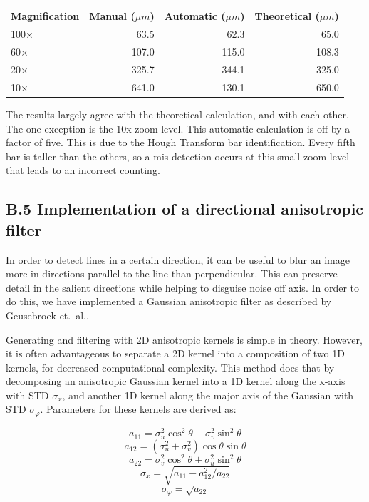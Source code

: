 \documentclass{article}
\begin{document}
\begin{center}
\begin{tabular}{l | r | r | r}
     Magnification & Manual ($\mu m$) & Automatic ($\mu m$) & Theoretical ($\mu m$) \\
     \hline\hline
     100$\times$                & 63.5            & 62.3               & 65.0 \\ \hline
     60$\times$                 & 107.0           & 115.0              & 108.3 \\ \hline
     20$\times$                 & 325.7           & 344.1              & 325.0 \\ \hline
     10$\times$                 & 641.0           & 130.1              & 650.0
\end{tabular}
\end{center}

The results largely agree with the theoretical calculation, and with each other. The one exception is the 10x zoom level. This automatic calculation is off by a factor of five. This is due to the Hough Transform bar identification. Every fifth bar is taller than the others, so a mis-detection occurs at this small zoom level that leads to an incorrect counting.


\subsection*{B.5 Implementation of a directional anisotropic filter}

In order to detect lines in a certain direction, it can be useful to blur an image more in directions parallel to the line than perpendicular. This can preserve detail in the salient directions while helping to disguise noise off axis. In order to do this, we have implemented a Gaussian anisotropic filter as described by Geusebroek et.\ al.\cite{geusebroek}.

Generating and filtering with 2D anisotropic kernels is simple in theory. However, it is often advantageous to separate a 2D kernel into a composition of two 1D kernels, for decreased computational complexity. This method does that by decomposing an anisotropic Gaussian kernel into a 1D kernel along the x-axis with STD $\sigma_x$, and another 1D kernel along the major axis of the Gaussian with STD $\sigma_\varphi$. Parameters for these kernels are derived as:

\[ a_{11} = \sigma_u^2 \cos^2 \theta + \sigma_v^2 \sin^2 \theta \]
\[ a_{12} = (\sigma_u^2 + \sigma_v^2)\cos\theta \sin\theta \]
\[ a_{22} = \sigma_v^2 \cos^2 \theta + \sigma_u^2 \sin^2 \theta \]
\[ \sigma_x = \sqrt{a_{11} - a_{12}^2/a_{22}} \]
\[ \sigma_\varphi = \sqrt{a_{22}} \]
\end{document}
